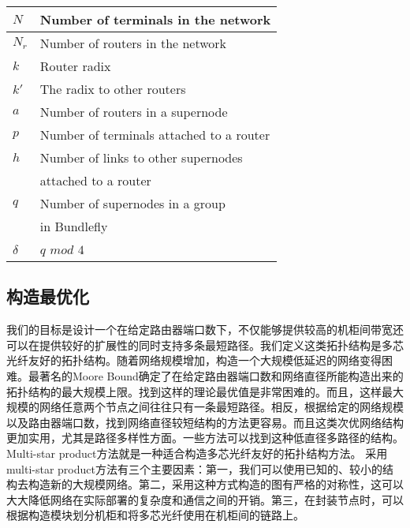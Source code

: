 \begin{table}[t]
\centering
  \vspace{-.3cm}
\begin{tabular}{l l}\hline
  \centering
  $N$ & Number of terminals in the network\\\hline
  $N_r$ & Number of routers in the network\\\hline
  $k$ & Router radix\\\hline
  $k'$ & The radix to other routers\\\hline
  $a$	& Number of routers in a supernode\\\hline
  $p$	& Number of terminals attached to a router\\\hline
  $h$	& Number of links to other supernodes\\
        & attached to a router\\\hline
  $q$	& Number of supernodes in a group \\
        & in Bundlefly\\\hline
  $\delta$ & $q$ $mod$ $4$\\\hline
\end{tabular}
   \label{Table1}
   \end{table}

\subsection{构造最优化}

我们的目标是设计一个在给定路由器端口数下，不仅能够提供较高的机柜间带宽还可以在提供较好的扩展性的同时支持多条最短路径。我们定义这类拓扑结构是多芯光纤友好的拓扑结构。随着网络规模增加，构造一个大规模低延迟的网络变得困难。最著名的Moore Bound确定了在给定路由器端口数和网络直径所能构造出来的拓扑结构的最大规模上限。找到这样的理论最优值是非常困难的。而且，这样最大规模的网络任意两个节点之间往往只有一条最短路径。相反，根据给定的网络规模以及路由器端口数，找到网络直径较短结构的方法更容易。而且这类次优网络结构更加实用，尤其是路径多样性方面。一些方法可以找到这种低直径多路径的结构。Multi-star product方法就是一种适合构造多芯光纤友好的拓扑结构方法。 采用multi-star product方法有三个主要因素：第一，我们可以使用已知的、较小的结构去构造新的大规模网络。第二，采用这种方式构造的图有严格的对称性，这可以大大降低网络在实际部署的复杂度和通信之间的开销。第三，在封装节点时，可以根据构造模块划分机柜和将多芯光纤使用在机柜间的链路上。

